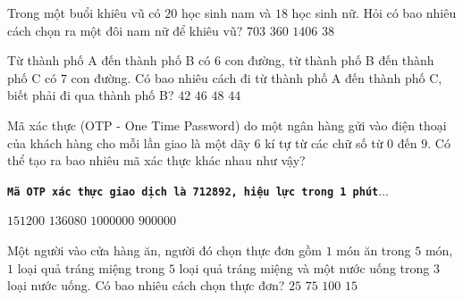 \begin{ex}%
	 Trong một buổi khiêu vũ có $20$ học sinh nam và $18$ học sinh nữ. Hỏi có bao nhiêu cách chọn ra một đôi nam nữ để khiêu vũ?
	 \choice
		 {$703$}
		{\True  $360$}
		 {$1406$}
		 {$38$}
\end{ex}

\begin{ex}%
	Từ thành phố A đến thành phố B có $6$ con đường, từ thành phố B đến thành phố C có $7$ con đường. Có bao nhiêu cách đi từ thành phố A đến thành phố C, biết phải đi  qua thành phố B?
	\choice 
		 {\True $42$}
		{$46$} 
		 {$48$}
		{$44$} 
\end{ex}

\begin{ex}%

	Mã xác thực (OTP - One Time Password) do một ngân hàng  gửi vào điện thoại của khách hàng cho mỗi lần giao là một dãy 6 kí tự từ các chữ số từ $0$ đến $9$. Có thể tạo ra bao nhiêu mã xác thực khác nhau như vậy?
	\begin{center}
		 \textbf{\texttt{Mã OTP xác thực giao dịch là 712892, hiệu lực trong 1 phút$\ldots$}}
	\end{center}
	 \choice
		{$151200$} 
		{$136080$} 
		{\True  $1000000$}
		{$900000$} 
\end{ex}

\begin{ex}%
	Một người vào cửa hàng ăn, người đó chọn thực đơn gồm $1$ món ăn trong $5$ món, $1$ loại quả tráng miệng trong $5$ loại quả tráng miệng và một nước uống  trong $3$ loại nước uống. Có bao nhiêu cách chọn thực đơn?
	 \choice
		 {$25$}
		{\True $75$} 
		 {$100$}
		 {$15$}
\end{ex}

